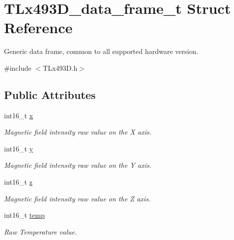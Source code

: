 \hypertarget{struct_t_lx493_d__data__frame__t}{}\section{T\+Lx493\+D\+\_\+data\+\_\+frame\+\_\+t Struct Reference}
\label{struct_t_lx493_d__data__frame__t}


Generic data frame, common to all supported hardware version.  




{\ttfamily \#include $<$T\+Lx493\+D.\+h$>$}

\subsection*{Public Attributes}
\begin{DoxyCompactItemize}
\item 
\mbox{\label{struct_t_lx493_d__data__frame__t_ac9e9d1455533b3d2e417f2064982a31d}} 
int16\+\_\+t \mbox{\hyperlink{struct_t_lx493_d__data__frame__t_ac9e9d1455533b3d2e417f2064982a31d}{x}}
\begin{DoxyCompactList}\small\item\em Magnetic field intensity raw value on the X axis. \end{DoxyCompactList}\item 
\mbox{\label{struct_t_lx493_d__data__frame__t_a95882762f5a26aaed29610c8d4ed8b4c}} 
int16\+\_\+t \mbox{\hyperlink{struct_t_lx493_d__data__frame__t_a95882762f5a26aaed29610c8d4ed8b4c}{y}}
\begin{DoxyCompactList}\small\item\em Magnetic field intensity raw value on the Y axis. \end{DoxyCompactList}\item 
\mbox{\label{struct_t_lx493_d__data__frame__t_afc28475d31ed47440530c04d85958adb}} 
int16\+\_\+t \mbox{\hyperlink{struct_t_lx493_d__data__frame__t_afc28475d31ed47440530c04d85958adb}{z}}
\begin{DoxyCompactList}\small\item\em Magnetic field intensity raw value on the Z axis. \end{DoxyCompactList}\item 
\mbox{\label{struct_t_lx493_d__data__frame__t_a318d6cd91a330f561fd0bb7a36f555c8}} 
int16\+\_\+t \mbox{\hyperlink{struct_t_lx493_d__data__frame__t_a318d6cd91a330f561fd0bb7a36f555c8}{temp}}
\begin{DoxyCompactList}\small\item\em Raw Temperature value. \end{DoxyCompactList}\end{DoxyCompactItemize}


